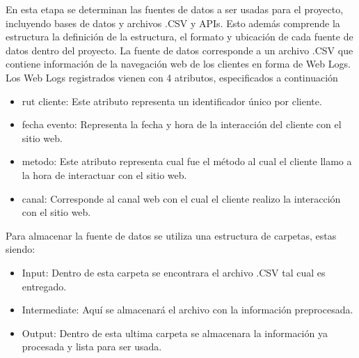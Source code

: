 En esta etapa se determinan las fuentes de datos a ser usadas para el proyecto, incluyendo bases de datos y archivos .CSV y APIs. Esto además comprende la estructura la definición de la estructura, el formato y ubicación de cada fuente de datos dentro del proyecto.
La fuente de datos corresponde a un archivo .CSV que contiene información de la navegación web de los clientes en forma de Web Logs. Los Web Logs registrados vienen con 4 atributos, especificados a continuación
\begin{itemize}
    \item rut cliente: Este atributo representa un identificador único por cliente.
    \item fecha evento: Representa la fecha y hora de la interacción del cliente con el sitio web.
    \item metodo: Este atributo representa cual fue el método al cual el cliente llamo a la hora de interactuar con el sitio web.
    \item canal: Corresponde al canal web con el cual el cliente realizo la interacción con el sitio web.
\end{itemize}

Para almacenar la fuente de datos se utiliza una estructura de carpetas, estas siendo:
\begin{itemize}
    \item Input: Dentro de esta carpeta se encontrara el archivo .CSV tal cual es entregado.
    \item Intermediate: Aquí se almacenará el archivo con la información preprocesada.
    \item Output: Dentro de esta ultima carpeta se almacenara la información ya procesada y lista para ser usada.
\end{itemize}
